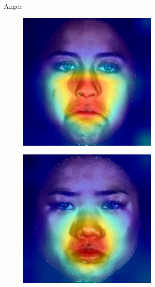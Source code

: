 \begin{figure}[ht]
\begin{subfigure}{0.45\textwidth}
\begin{subfigure}{0.45\textwidth}
        \end{subfigure}
        \caption{Anger}
    \end{subfigure}
    \hspace{0.05\textwidth} %
    \begin{subfigure}{0.45\textwidth}
        \centering
        \begin{subfigure}{0.45\textwidth}
            \includegraphics[width=\linewidth]{Images/Heatmaps/heatmap_sadness_1.png}
        \end{subfigure}
        \begin{subfigure}{0.45\textwidth}
            \includegraphics[width=\linewidth]{Images/Heatmaps/heatmap_sadness_2.png}

\end{subfigure}
\end{subfigure}
\end{figure}
